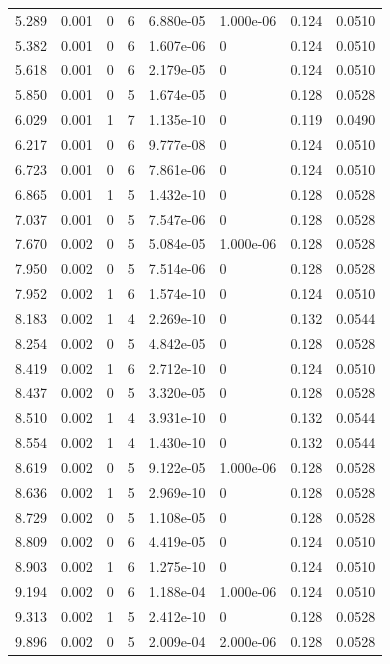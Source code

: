 \documentclass[preview]{standalone}
\begin{document}
{{\begin{tabular}{L{1.2cm}C{1.2cm} C{0.3cm}C{0.5cm} C{1.4cm}C{1.4cm} C{1.4cm}C{1.4cm}}
  5.289  &  0.001  & 0     &  6 &  6.880e-05  & 1.000e-06  & 0.124 &  0.0510   \\ 
  5.382  &  0.001  & 0     &  6 &  1.607e-06  & 0  & 0.124 &  0.0510   \\ 
  5.618  &  0.001  & 0     &  6 &  2.179e-05  & 0  & 0.124 &  0.0510   \\ 
  5.850  &  0.001  & 0     &  5 &  1.674e-05  & 0  & 0.128 &  0.0528   \\ 
  6.029  &  0.001  & 1     &  7 &  1.135e-10  & 0  & 0.119 &  0.0490   \\ 
  6.217  &  0.001  & 0     &  6 &  9.777e-08  & 0  & 0.124 &  0.0510   \\ 
  6.723  &  0.001  & 0     &  6 &  7.861e-06  & 0  & 0.124 &  0.0510   \\ 
  6.865  &  0.001  & 1     &  5 &  1.432e-10  & 0  & 0.128 &  0.0528   \\ 
  7.037  &  0.001  & 0     &  5 &  7.547e-06  & 0  & 0.128 &  0.0528   \\ 
  7.670  &  0.002  & 0     &  5 &  5.084e-05  & 1.000e-06  & 0.128 &  0.0528   \\ 
  7.950  &  0.002  & 0     &  5 &  7.514e-06  & 0  & 0.128 &  0.0528   \\ 
  7.952  &  0.002  & 1     &  6 &  1.574e-10  & 0  & 0.124 &  0.0510   \\ 
  8.183  &  0.002  & 1     &  4 &  2.269e-10  & 0  & 0.132 &  0.0544   \\ 
  8.254  &  0.002  & 0     &  5 &  4.842e-05  & 0  & 0.128 &  0.0528   \\ 
  8.419  &  0.002  & 1     &  6 &  2.712e-10  & 0  & 0.124 &  0.0510   \\ 
  8.437  &  0.002  & 0     &  5 &  3.320e-05  & 0  & 0.128 &  0.0528   \\ 
  8.510  &  0.002  & 1     &  4 &  3.931e-10  & 0  & 0.132 &  0.0544   \\ 
  8.554  &  0.002  & 1     &  4 &  1.430e-10  & 0  & 0.132 &  0.0544   \\ 
  8.619  &  0.002  & 0     &  5 &  9.122e-05  & 1.000e-06  & 0.128 &  0.0528   \\ 
  8.636  &  0.002  & 1     &  5 &  2.969e-10  & 0  & 0.128 &  0.0528   \\ 
  8.729  &  0.002  & 0     &  5 &  1.108e-05  & 0  & 0.128 &  0.0528   \\ 
  8.809  &  0.002  & 0     &  6 &  4.419e-05  & 0  & 0.124 &  0.0510   \\ 
  8.903  &  0.002  & 1     &  6 &  1.275e-10  & 0  & 0.124 &  0.0510   \\ 
  9.194  &  0.002  & 0     &  6 &  1.188e-04  & 1.000e-06  & 0.124 &  0.0510   \\ 
  9.313  &  0.002  & 1     &  5 &  2.412e-10  & 0  & 0.128 &  0.0528   \\ 
  9.896  &  0.002  & 0     &  5 &  2.009e-04  & 2.000e-06  & 0.128 &  0.0528   \\ 
\hline 
\end{tabular} 

}}
\end{document}
